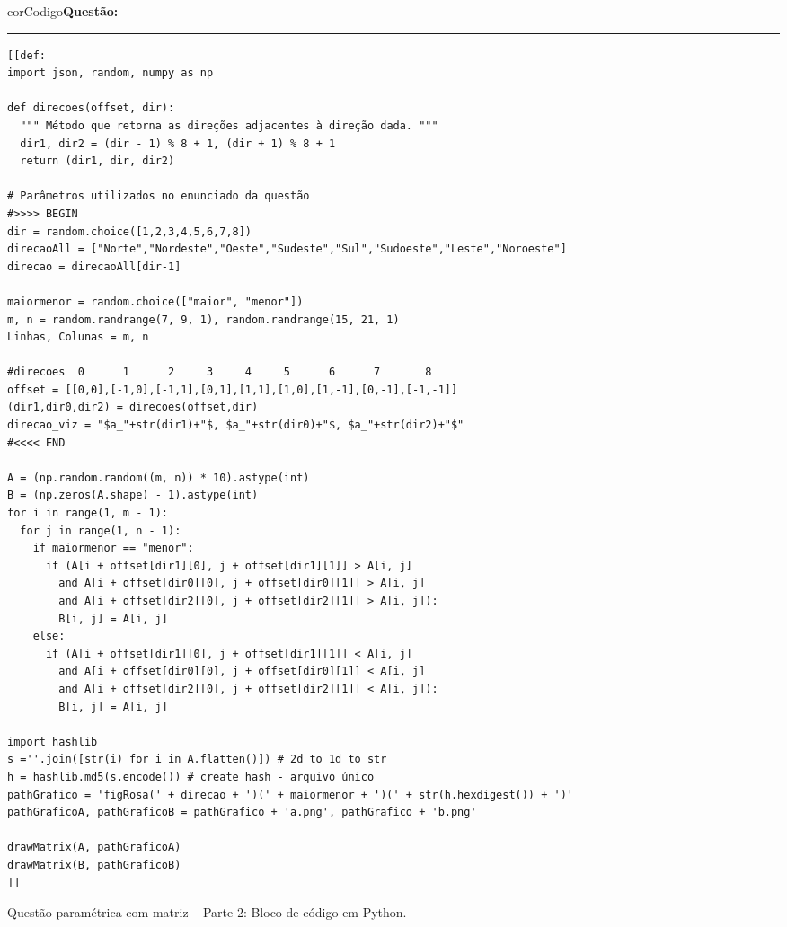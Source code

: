 \begin{listing}[!ht]
\begin{myboxCode}{corCodigo}{\textbf{Questão: } }\vspace{3mm}
\hrule
{\footnotesize
\begin{verbatim}
[[def:
import json, random, numpy as np

def direcoes(offset, dir):
  """ Método que retorna as direções adjacentes à direção dada. """
  dir1, dir2 = (dir - 1) % 8 + 1, (dir + 1) % 8 + 1
  return (dir1, dir, dir2)
    
# Parâmetros utilizados no enunciado da questão 
#>>>> BEGIN 
dir = random.choice([1,2,3,4,5,6,7,8])  
direcaoAll = ["Norte","Nordeste","Oeste","Sudeste","Sul","Sudoeste","Leste","Noroeste"]
direcao = direcaoAll[dir-1]

maiormenor = random.choice(["maior", "menor"])
m, n = random.randrange(7, 9, 1), random.randrange(15, 21, 1)
Linhas, Colunas = m, n

#direcoes  0      1      2     3     4     5      6      7       8
offset = [[0,0],[-1,0],[-1,1],[0,1],[1,1],[1,0],[1,-1],[0,-1],[-1,-1]]
(dir1,dir0,dir2) = direcoes(offset,dir)
direcao_viz = "$a_"+str(dir1)+"$, $a_"+str(dir0)+"$, $a_"+str(dir2)+"$"
#<<<< END 

A = (np.random.random((m, n)) * 10).astype(int)
B = (np.zeros(A.shape) - 1).astype(int)
for i in range(1, m - 1):
  for j in range(1, n - 1):
    if maiormenor == "menor":
      if (A[i + offset[dir1][0], j + offset[dir1][1]] > A[i, j]
        and A[i + offset[dir0][0], j + offset[dir0][1]] > A[i, j]
        and A[i + offset[dir2][0], j + offset[dir2][1]] > A[i, j]):
        B[i, j] = A[i, j]
    else:
      if (A[i + offset[dir1][0], j + offset[dir1][1]] < A[i, j]
        and A[i + offset[dir0][0], j + offset[dir0][1]] < A[i, j]
        and A[i + offset[dir2][0], j + offset[dir2][1]] < A[i, j]):
        B[i, j] = A[i, j]

import hashlib
s =''.join([str(i) for i in A.flatten()]) # 2d to 1d to str
h = hashlib.md5(s.encode()) # create hash - arquivo único
pathGrafico = 'figRosa(' + direcao + ')(' + maiormenor + ')(' + str(h.hexdigest()) + ')' 
pathGraficoA, pathGraficoB = pathGrafico + 'a.png', pathGrafico + 'b.png'

drawMatrix(A, pathGraficoA)
drawMatrix(B, pathGraficoB)
]]
\end{verbatim}
}
\end{myboxCode}
\caption{Questão paramétrica com matriz -- Parte 2: Bloco de código em Python.}
\label{lst:questaoMatrizRosaParte2}
\end{listing}

